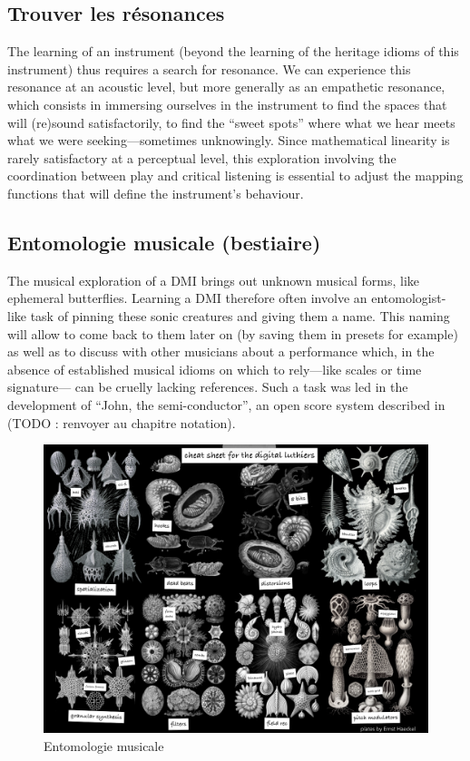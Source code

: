 	
\subsection{Trouver les résonances}

The learning of an instrument (beyond the learning of the heritage idioms of this instrument) thus requires a search for resonance. We can experience this resonance at an acoustic level, but more generally as an empathetic resonance, which consists in immersing ourselves in the instrument to find the spaces that will (re)sound satisfactorily, to find the “sweet spots” where what we hear meets what we were seeking—sometimes unknowingly. Since mathematical linearity is rarely satisfactory at a perceptual level, this exploration involving the coordination between play and critical listening is essential to adjust the mapping functions that will define the instrument's behaviour.
	
\subsection{Entomologie musicale (bestiaire)}
The musical exploration of a DMI brings out unknown musical forms, like ephemeral butterflies. Learning a DMI therefore often involve an entomologist-like task of pinning these sonic creatures and giving them a name. This naming will allow to come back to them later on (by saving them in presets for example) as well as to discuss with other musicians about a performance which, in the absence of established musical idioms on which to rely—like scales or time signature— can be cruelly lacking references. Such a task was led in the development of “John, the semi-conductor”, an open score system described in \cite{goudard_john_2018} (TODO : renvoyer au chapitre notation).



\begin{figure}[!htbp]
	\includegraphics[width=\textwidth]{gfx/02_ephemeral/Bestiaire.png}
	\caption{Entomologie musicale}
	\label{fig:ephemeral:entomologie}
\end{figure}

